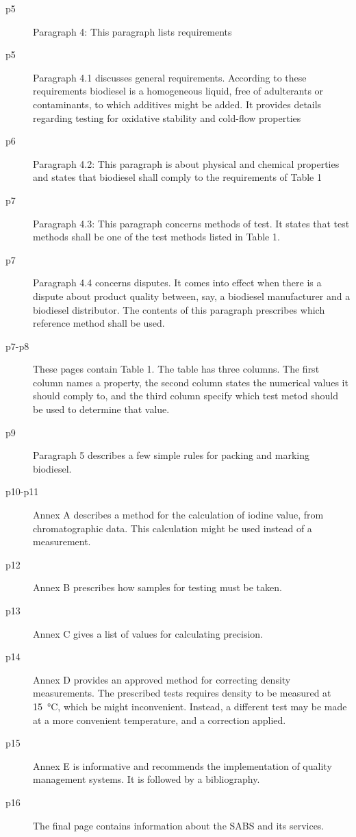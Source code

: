 \begin{description}
\item[p5]{Paragraph 4: This paragraph lists requirements} 

\item[p5]{Paragraph 4.1 discusses general requirements. According to these
requirements biodiesel is a homogeneous liquid, free of adulterants or
contaminants, to which additives might be added. It provides details regarding
testing for oxidative stability and cold-flow properties}

\item[p6]{Paragraph 4.2: This paragraph is about physical and chemical
properties and states that biodiesel shall comply to the requirements of Table
1}

\item[p7]{Paragraph 4.3: This paragraph concerns methods of test. It states that
test methods shall be  one of the test methods listed in Table 1.}

\item[p7]{Paragraph 4.4 concerns disputes. It comes into effect when there is a
dispute about product quality between, say, a biodiesel manufacturer and a
biodiesel distributor. The contents of this paragraph prescribes which reference
method shall be used.}

\item[p7-p8]{These pages contain Table 1. The table has three columns. The first
column names a property, the second column states the numerical values it should
comply to, and the third column specify which test metod should be used to
determine that value.}

\item[p9]{Paragraph 5 describes a few simple rules for packing and marking biodiesel.}

\item[p10-p11]{Annex A describes a method for the calculation of iodine value,
from chromatographic data. This calculation might be used instead of a
measurement.}

\item[p12]{Annex B prescribes how samples for testing must be taken.}

\item[p13]{Annex C gives a list of values for calculating precision.}

\item[p14]{Annex D provides an approved method for correcting density
measurements. The prescribed tests requires density to be measured at
\SI{15}{\celsius}, which be might inconvenient. Instead, a different test may be
made at a more convenient temperature, and a correction applied. }

\item[p15]{Annex E is informative and recommends the implementation of quality
management systems. It is followed by a bibliography.}

\item[p16]{The final page contains information about the SABS and its services.}

\end{description} 

